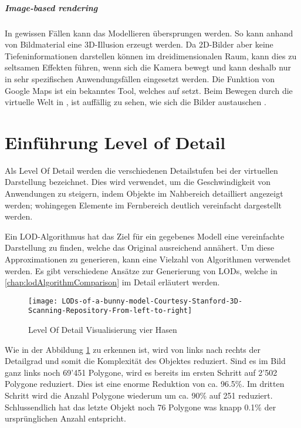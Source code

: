 \subparagraph{Image-based rendering}
In gewissen Fällen kann das Modellieren übersprungen werden. So kann anhand von Bildmaterial eine 3D-Illusion erzeugt werden. Da 2D-Bilder aber keine Tiefeninformationen darstellen können im dreidimensionalen Raum, kann dies zu seltsamen Effekten führen, wenn sich die Kamera bewegt und kann deshalb nur in sehr spezifischen Anwendungsfällen eingesetzt werden. Die  Funktion von Google Maps ist ein bekanntes Tool, welches auf  setzt.
Beim Bewegen durch die virtuelle Welt in , ist auffällig zu sehen, wie sich die Bilder austauschen \cite{imageBasedRendering}.

\section{Einführung Level of Detail}
\label{chap:lodIntroduction}
Als Level Of Detail werden die verschiedenen Detailstufen bei der virtuellen Darstellung bezeichnet.
Dies wird verwendet, um die Geschwindigkeit von Anwendungen zu steigern, indem Objekte im Nahbereich detailliert angezeigt werden; wohingegen Elemente im Fernbereich deutlich vereinfacht dargestellt werden.

Ein LOD-Algorithmus hat das Ziel für ein gegebenes Modell eine vereinfachte Darstellung zu finden, welche das Original ausreichend annähert. Um diese Approximationen zu generieren, kann eine Vielzahl von Algorithmen verwendet werden. Es gibt verschiedene Ansätze zur Generierung von LODs, welche in \autoref{chap:lodAlgorithmComparison} im Detail erläutert werden.

\begin{figure}[H]
\centering
\texttt{[image: LODs-of-a-bunny-model-Courtesy-Stanford-3D-Scanning-Repository-From-left-to-right]}
\caption{Level Of Detail Visualisierung vier Hasen \cite{stanfordBunnyModel}}
\label{fig:LevelOfDetailVisualisierungvierHasen}
\end{figure}

Wie in der Abbildung \ref{fig:LevelOfDetailVisualisierungvierHasen} zu erkennen ist, wird von links nach rechts der Detailgrad und somit die Komplexität des Objektes reduziert. Sind es im Bild ganz links noch 69'451 Polygone, wird es bereits im ersten Schritt auf 2'502 Polygone reduziert. Dies ist eine enorme Reduktion von ca. 96.5\%. Im dritten Schritt wird die Anzahl Polygone wiederum um ca. 90\% auf 251 reduziert. Schlussendlich hat das letzte Objekt noch 76 Polygone was knapp 0.1\% der ursprünglichen Anzahl entspricht.

